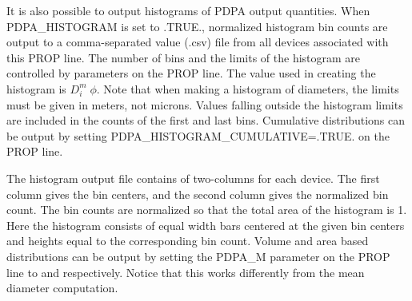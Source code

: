 \documentclass[11pt]{book}
\begin{document}
It is also possible to output histograms of PDPA output quantities. When {\ct PDPA\_HISTOGRAM} is set to {\ct .TRUE.}, normalized histogram bin counts are output to a comma-separated value (.csv) file from all devices associated with this {\ct PROP} line. The number of bins and the limits of the histogram are controlled by parameters on the {\ct PROP} line. The value used in creating the histogram is $D_i^m \; \phi$. Note that when making a histogram of diameters, the limits must be given in meters, not microns. Values falling outside the histogram limits are included in the counts of the first and last bins. Cumulative distributions can be output by setting {\ct PDPA\_HISTOGRAM\_CUMULATIVE=.TRUE.} on the {\ct PROP} line.

The histogram output file contains of two-columns for each device. The first column gives the bin centers, and the second column gives the normalized bin count. The bin counts are normalized so that the total area of the histogram is 1. Here the histogram consists of equal width bars centered at the given bin centers and heights equal to the corresponding bin count. Volume and area based distributions can be output by setting the {\ct PDPA\_M} parameter on the {\ct PROP} line to {} and {} respectively. Notice that this works differently from the mean diameter computation.
\end{document}
